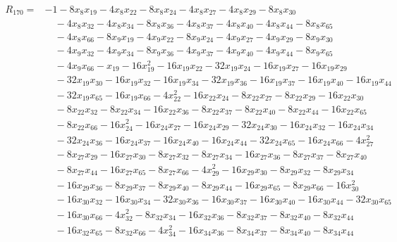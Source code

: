 \begin{equation*}\begin{split}
R_{170}={}&-1 - 8x_{8} x_{19} - 4x_{8} x_{22} - 8x_{8} x_{24} - 4x_{8} x_{27} - 4x_{8} x_{29} - 8x_{8} x_{30}\\
&\quad -4x_{8} x_{32} - 4x_{8} x_{34} - 8x_{8} x_{36} - 4x_{8} x_{37} - 4x_{8} x_{40} - 4x_{8} x_{44} - 8x_{8} x_{65}\\
&\quad -4x_{8} x_{66} - 8x_{9} x_{19} - 4x_{9} x_{22} - 8x_{9} x_{24} - 4x_{9} x_{27} - 4x_{9} x_{29} - 8x_{9} x_{30}\\
&\quad -4x_{9} x_{32} - 4x_{9} x_{34} - 8x_{9} x_{36} - 4x_{9} x_{37} - 4x_{9} x_{40} - 4x_{9} x_{44} - 8x_{9} x_{65}\\
&\quad -4x_{9} x_{66} - x_{19} - 16x_{19}^{2} - 16x_{19} x_{22} - 32x_{19} x_{24} - 16x_{19} x_{27} - 16x_{19} x_{29}\\
&\quad -32x_{19} x_{30} - 16x_{19} x_{32} - 16x_{19} x_{34} - 32x_{19} x_{36} - 16x_{19} x_{37} - 16x_{19} x_{40} - 16x_{19} x_{44}\\
&\quad -32x_{19} x_{65} - 16x_{19} x_{66} - 4x_{22}^{2} - 16x_{22} x_{24} - 8x_{22} x_{27} - 8x_{22} x_{29} - 16x_{22} x_{30}\\
&\quad -8x_{22} x_{32} - 8x_{22} x_{34} - 16x_{22} x_{36} - 8x_{22} x_{37} - 8x_{22} x_{40} - 8x_{22} x_{44} - 16x_{22} x_{65}\\
&\quad -8x_{22} x_{66} - 16x_{24}^{2} - 16x_{24} x_{27} - 16x_{24} x_{29} - 32x_{24} x_{30} - 16x_{24} x_{32} - 16x_{24} x_{34}\\
&\quad -32x_{24} x_{36} - 16x_{24} x_{37} - 16x_{24} x_{40} - 16x_{24} x_{44} - 32x_{24} x_{65} - 16x_{24} x_{66} - 4x_{27}^{2}\\
&\quad -8x_{27} x_{29} - 16x_{27} x_{30} - 8x_{27} x_{32} - 8x_{27} x_{34} - 16x_{27} x_{36} - 8x_{27} x_{37} - 8x_{27} x_{40}\\
&\quad -8x_{27} x_{44} - 16x_{27} x_{65} - 8x_{27} x_{66} - 4x_{29}^{2} - 16x_{29} x_{30} - 8x_{29} x_{32} - 8x_{29} x_{34}\\
&\quad -16x_{29} x_{36} - 8x_{29} x_{37} - 8x_{29} x_{40} - 8x_{29} x_{44} - 16x_{29} x_{65} - 8x_{29} x_{66} - 16x_{30}^{2}\\
&\quad -16x_{30} x_{32} - 16x_{30} x_{34} - 32x_{30} x_{36} - 16x_{30} x_{37} - 16x_{30} x_{40} - 16x_{30} x_{44} - 32x_{30} x_{65}\\
&\quad -16x_{30} x_{66} - 4x_{32}^{2} - 8x_{32} x_{34} - 16x_{32} x_{36} - 8x_{32} x_{37} - 8x_{32} x_{40} - 8x_{32} x_{44}\\
&\quad -16x_{32} x_{65} - 8x_{32} x_{66} - 4x_{34}^{2} - 16x_{34} x_{36} - 8x_{34} x_{37} - 8x_{34} x_{40} - 8x_{34} x_{44}\\

\end{split}
\end{equation*}
